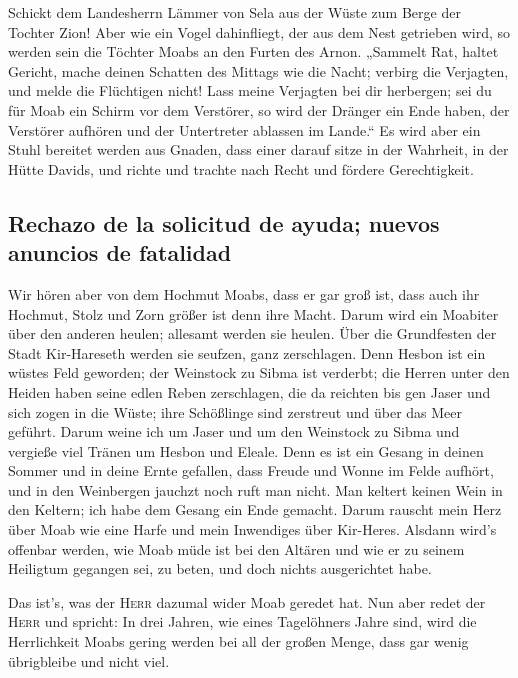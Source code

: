  Schickt dem Landesherrn Lämmer von Sela aus der Wüste zum
Berge der Tochter Zion!  Aber wie ein Vogel dahinfliegt,
der aus dem Nest getrieben wird, so werden sein die Töchter Moabs an den
Furten des Arnon.  „Sammelt Rat, haltet Gericht, mache
deinen Schatten des Mittags wie die Nacht; verbirg die Verjagten, und
melde die Flüchtigen nicht!  Lass meine Verjagten bei dir
herbergen; sei du für Moab ein Schirm vor dem Verstörer, so wird der
Dränger ein Ende haben, der Verstörer aufhören und der Untertreter
ablassen im Lande.``  Es wird aber ein Stuhl bereitet
werden aus Gnaden, dass einer darauf sitze in der Wahrheit, in der Hütte
Davids, und richte und trachte nach Recht und fördere Gerechtigkeit.

\hypertarget{rechazo-de-la-solicitud-de-ayuda-nuevos-anuncios-de-fatalidad}{%
\subsection{Rechazo de la solicitud de ayuda; nuevos anuncios de
fatalidad}\label{rechazo-de-la-solicitud-de-ayuda-nuevos-anuncios-de-fatalidad}}

 Wir hören aber von dem Hochmut Moabs, dass er gar groß
ist, dass auch ihr Hochmut, Stolz und Zorn größer ist denn ihre Macht.
 Darum wird ein Moabiter über den anderen heulen; allesamt
werden sie heulen. Über die Grundfesten der Stadt Kir-Hareseth werden
sie seufzen, ganz zerschlagen.  Denn Hesbon ist ein wüstes
Feld geworden; der Weinstock zu Sibma ist verderbt; die Herren unter den
Heiden haben seine edlen Reben zerschlagen, die da reichten bis gen
Jaser und sich zogen in die Wüste; ihre Schößlinge sind zerstreut und
über das Meer geführt.  Darum weine ich um Jaser und um
den Weinstock zu Sibma und vergieße viel Tränen um Hesbon und Eleale.
Denn es ist ein Gesang in deinen Sommer und in deine Ernte gefallen,
 dass Freude und Wonne im Felde aufhört, und in den
Weinbergen jauchzt noch ruft man nicht. Man keltert keinen Wein in den
Keltern; ich habe dem Gesang ein Ende gemacht.  Darum
rauscht mein Herz über Moab wie eine Harfe und mein Inwendiges über
Kir-Heres.  Alsdann wird's offenbar werden, wie Moab müde
ist bei den Altären und wie er zu seinem Heiligtum gegangen sei, zu
beten, und doch nichts ausgerichtet habe.

 Das ist's, was der \textsc{Herr} dazumal wider Moab
geredet hat.  Nun aber redet der \textsc{Herr} und
spricht: In drei Jahren, wie eines Tagelöhners Jahre sind, wird die
Herrlichkeit Moabs gering werden bei all der großen Menge, dass gar
wenig übrigbleibe und nicht viel.

